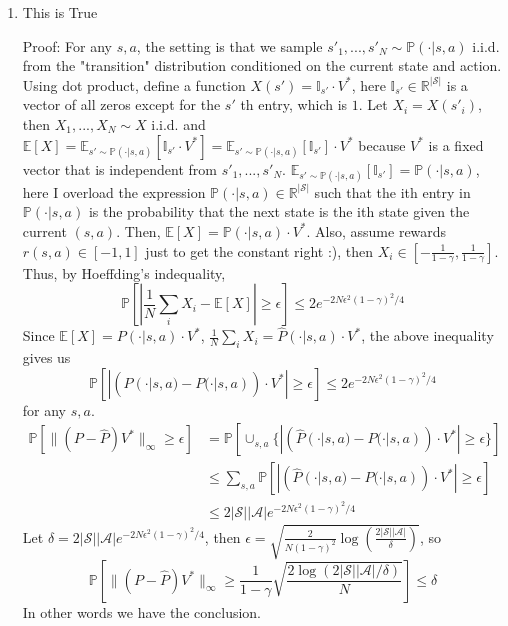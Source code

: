 \documentclass[10pt]{report}
\begin{document}
\begin{enumerate}
	\item 
	This is True

	Proof: For any $s, a$, the setting is that we sample $s'_1, ..., s'_N \sim \mathbb{P}(\cdot | s, a)$ i.i.d. from the "transition" distribution conditioned on the current state and action. Using dot product, define a function $X(s') = \mathbb{I}_{s'} \cdot V^*$, here $\mathbb{I}_{s'} \in \mathbb{R}^{|\mathcal{S}|}$ is a vector of all zeros except for the $s'$ th entry, which is $1$. Let $X_i = X(s'_i)$, then $X_1, ..., X_N \sim X$ i.i.d. and $\mathbb{E}[X] = \mathbb{E}_{s' \sim \mathbb{P}(\cdot | s, a)}[\mathbb{I}_{s'} \cdot V^*] = \mathbb{E}_{s' \sim \mathbb{P}(\cdot | s, a)}[\mathbb{I}_{s'}] \cdot V^*$ because $V^*$ is a fixed vector that is independent from $s'_1, ..., s'_N$. $\mathbb{E}_{s' \sim \mathbb{P}(\cdot | s, a)} [\mathbb{I}_{s'}] = \mathbb{P}(\cdot | s, a)$, here I overload the expression $\mathbb{P}(\cdot | s, a) \in \mathbb{R}^{|\mathcal{S}|}$ such that the ith entry in $\mathbb{P}(\cdot | s, a)$ is the probability that the next state is the ith state given the current $(s, a)$. Then, $\mathbb{E}[X] = \mathbb{P}(\cdot | s, a) \cdot V^*$. Also, assume rewards $r(s, a) \in [-1, 1]$ just to get the constant right :), then $X_i \in [-\frac{1}{1-\gamma}, \frac{1}{1-\gamma}]$. Thus, by Hoeffding's indequality, 
	$$\mathbb{P}[|\frac{1}{N} \sum_i X_i - \mathbb{E}[X]| \geq \epsilon] \leq 2 e^{-2 N \epsilon^2 (1-\gamma)^2 / 4}$$
	Since $\mathbb{E}[X] = P(\cdot | s, a) \cdot V^*$, $\frac{1}{N} \sum_i X_i = \widehat{P}(\cdot | s, a) \cdot V^*$, the above inequality gives us 
	$$\mathbb{P}[|(\widehat{P}(\cdot | s, a) - P(\cdot | s, a)) \cdot V^*| \geq \epsilon] \leq 2 e^{-2 N \epsilon^2 (1-\gamma)^2 / 4}$$
	for any $s, a$. 
	\begin{align*}
		\mathbb{P}[\lVert (P-\widehat{P})V^* \rVert_\infty \geq \epsilon] &= \mathbb{P}[\cup_{s, a} \{|(\widehat{P}(\cdot | s, a) - P(\cdot | s, a)) \cdot V^*| \geq \epsilon\}] \\
		&\leq \sum_{s, a} \mathbb{P}[|(\widehat{P}(\cdot | s, a) - P(\cdot | s, a)) \cdot V^*| \geq \epsilon] \\
		&\leq 2|\mathcal{S}||\mathcal{A}|e^{-2 N \epsilon^2 (1 - \gamma)^2 / 4}
	\end{align*}
	Let $\delta = 2|\mathcal{S}||\mathcal{A}|e^{-2N \epsilon^2 (1 - \gamma)^2 / 4}$, then $\epsilon = \sqrt{\frac{2}{N (1-\gamma)^2} \log(\frac{2|\mathcal{S}||\mathcal{A}|}{\delta})}$, so 
	$$\mathbb{P}[\lVert (P - \widehat{P}) V^* \rVert_\infty \geq \frac{1}{1-\gamma} \sqrt{\frac{2 \log(2|\mathcal{S}||\mathcal{A}|/\delta)}{N}}] \leq \delta$$
	In other words we have the conclusion.



\end{enumerate}
\end{document}
